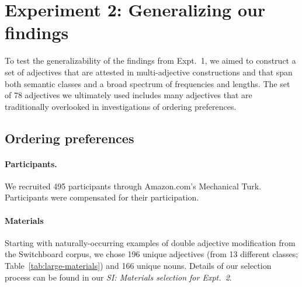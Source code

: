 \documentclass[manuscript]{stjour}
\begin{document}
\section{Experiment 2: Generalizing our findings}

To test the generalizability of the findings from Expt.~1, we aimed to construct a set of adjectives that are attested in multi-adjective constructions and that span both semantic classes and a broad spectrum of frequencies and lengths.  
The set of 78 adjectives we ultimately used includes many adjectives that are traditionally overlooked in investigations of ordering preferences.

\subsection{Ordering preferences}

\paragraph{Participants.} We recruited 495 participants through Amazon.com's Mechanical Turk. Participants were compensated for their participation.

\paragraph{Materials}
Starting with naturally-occurring examples of double adjective modification from the Switchboard corpus, we chose 196 unique adjectives (from 13 different classes; Table~\ref{tab:large-materials}) and 166 unique nouns. Details of our selection process can be found in our \textit{SI: Materials selection for Expt.~2}.
\end{document}
